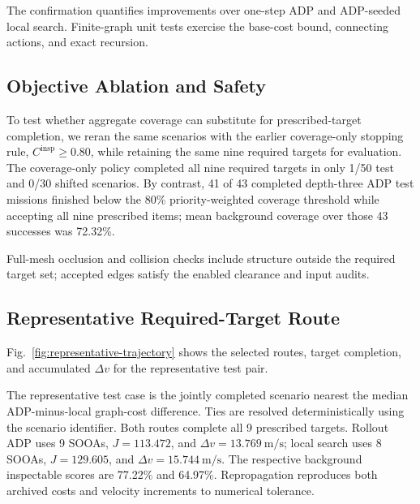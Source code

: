 \documentclass{IEEEtaes}
\begin{document}
The confirmation quantifies improvements over one-step ADP and ADP-seeded local search. Finite-graph unit tests exercise the base-cost bound, connecting actions, and exact recursion.

\subsection{Objective Ablation and Safety}

To test whether aggregate coverage can substitute for prescribed-target completion, we reran the same scenarios with the earlier coverage-only stopping rule, $C^{\mathrm{insp}}\ge0.80$, while retaining the same nine required targets for evaluation. The coverage-only policy completed all nine required targets in only 1/50 test and 0/30 shifted scenarios. By contrast, 41 of 43 completed depth-three ADP test missions finished below the 80\% priority-weighted coverage threshold while accepting all nine prescribed items; mean background coverage over those 43 successes was 72.32\%.

Full-mesh occlusion and collision checks include structure outside the required target set; accepted edges satisfy the enabled clearance and input audits.

\subsection{Representative Required-Target Route}

Fig.~\ref{fig:representative-trajectory} shows the selected routes, target completion, and accumulated $\Delta v$ for the representative test pair.

The representative test case is the jointly completed scenario nearest the median ADP-minus-local graph-cost difference. Ties are resolved deterministically using the scenario identifier. Both routes complete all 9 prescribed targets. Rollout ADP uses 9 SOOAs, $J=113.472$, and $\Delta v=13.769~\mathrm{m/s}$; local search uses 8 SOOAs, $J=129.605$, and $\Delta v=15.744~\mathrm{m/s}$. The respective background inspectable scores are 77.22\% and 64.97\%. Repropagation reproduces both archived costs and velocity increments to numerical tolerance.
\end{document}
